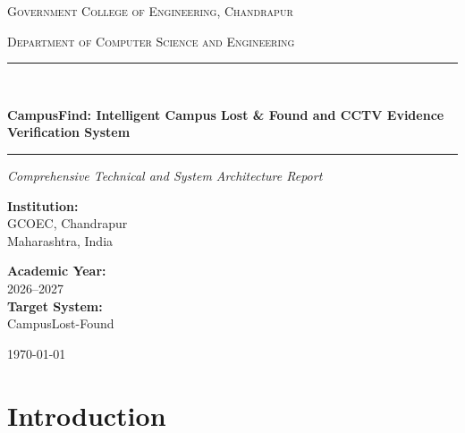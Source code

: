 \documentclass[11pt,a4paper]{article}
\begin{document}
\begin{titlepage}
\centering
\vspace*{1.5cm}

{\scshape\Large Government College of Engineering, Chandrapur\par}
\vspace{0.3cm}
{\scshape\normalsize Department of Computer Science and Engineering\par}
\vspace{1.8cm}

\rule{\linewidth}{1.2pt}\\[0.4cm]
{\huge\bfseries CampusFind: Intelligent Campus Lost \& Found and CCTV Evidence Verification System\par}
\vspace{0.2cm}
\rule{\linewidth}{1.2pt}

\vspace{1.5cm}
{\Large\textit{Comprehensive Technical and System Architecture Report}\par}

\vspace{2.5cm}
\begin{minipage}{0.5\textwidth}
\begin{flushleft} \large
\textbf{Institution:}\\
GCOEC, Chandrapur\\
Maharashtra, India
\end{flushleft}
\end{minipage}
\begin{minipage}{0.45\textwidth}
\begin{flushright} \large
\textbf{Academic Year:}\\
2026--2027\\[0.2cm]
\textbf{Target System:}\\
CampusLost-Found
\end{flushright}
\end{minipage}

\vfill
{\large\today\par}
\end{titlepage}

\tableofcontents
\newpage

\section{Introduction}
\end{document}
